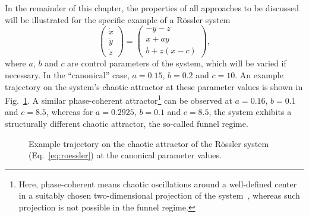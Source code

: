 \documentclass[graybox]{svmult}
\begin{document}
In the remainder of this chapter, the properties of all approaches to be discussed will be illustrated for the specific example of a R\"ossler system \cite{Roessler1976}
\begin{equation}
\left( \begin{array}{c}\dot{x}\\ \dot{y}\\ \dot{z}\end{array} \right) = \left( \begin{array}{c} -y-z\\ x+ay\\ b+z(x-c) \end{array} \right),
\label{eq:roessler}
\end{equation}
\noindent
where $a$, $b$ and $c$ are control parameters of the system, which will be varied if necessary. In the ``canonical'' case, $a=0.15$, $b=0.2$ and $c=10$. An example trajectory on the system's chaotic attractor at these parameter values is shown in Fig.~\ref{fig:attractor}. A similar phase-coherent attractor\footnote{Here, phase-coherent means chaotic oscillations around a well-defined center in a suitably chosen two-dimensional projection of the system~\cite{Zou2012aChaos,Zou2012bChaos}, whereas such projection is not possible in the funnel regime.} can be observed at $a=0.16$, $b=0.1$ and $c=8.5$, whereas for $a=0.2925$, $b=0.1$ and $c=8.5$, the system exhibits a structurally different chaotic attractor, the so-called funnel regime. 

\begin{figure}
\centering
{}
\caption{Example trajectory on the chaotic attractor of the R\"ossler system (Eq.~\ref{eq:roessler}) at the canonical parameter values.}
\label{fig:attractor}
\end{figure}
\end{document}
